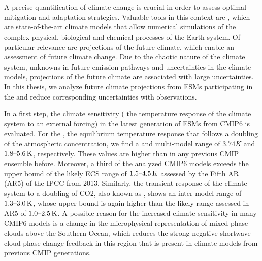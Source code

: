 


\chapter{\abstractname}

A precise quantification of climate change is crucial in order to assess
optimal mitigation and adaptation strategies. Valuable tools in this context
are , which are state-of-the-art climate models that allow
numerical simulations of the complex physical, biological and chemical
processes of the Earth system. Of particular relevance are projections of the
future climate, which enable an assessment of future climate change. Due to the
chaotic nature of the climate system, unknowns in future emission pathways and
uncertainties in the climate models, projections of the future climate are
associated with large uncertainties. In this thesis, we analyze future climate
projections from \acsp{ESM} participating in the  and reduce
corresponding uncertainties with observations.

In a first step, the climate sensitivity (\ie{} the temperature response of the
climate system to an external forcing) in the latest generation of \acsp{ESM}
from \acs{CMIP}6 is evaluated. For the , the equilibrium
temperature response that follows a doubling of the atmospheric
 concentration, we find a  and multi-model
range of $3.74 \unit{K}$ and $\rangeunit{1.8}{5.6}{K}$, respectively. These
values are higher than in any previous \acs{CMIP} ensemble before. Moreover, a
third of the analyzed \acs{CMIP}6 models exceeds the upper bound of the likely
\acs{ECS} range of $\rangeunit{1.5}{4.5}{K}$ assessed by the Fifth \acl{AR}
(\acs{AR}5) of the \acl{IPCC} from 2013. Similarly, the transient response of
the climate system to a doubling of \acs{CO2}, also known as ,
shows an inter-model range of $\rangeunit{1.3}{3.0}{K}$, whose upper bound is
again higher than the likely range assessed in \acs{AR}5 of
$\rangeunit{1.0}{2.5}{K}$. A possible reason for the increased climate
sensitivity in many \acs{CMIP}6 models is a change in the microphysical
representation of mixed-phase clouds above the Southern Ocean, which reduces
the strong negative shortwave cloud phase change feedback in this region that
is present in climate models from previous \acs{CMIP} generations.

